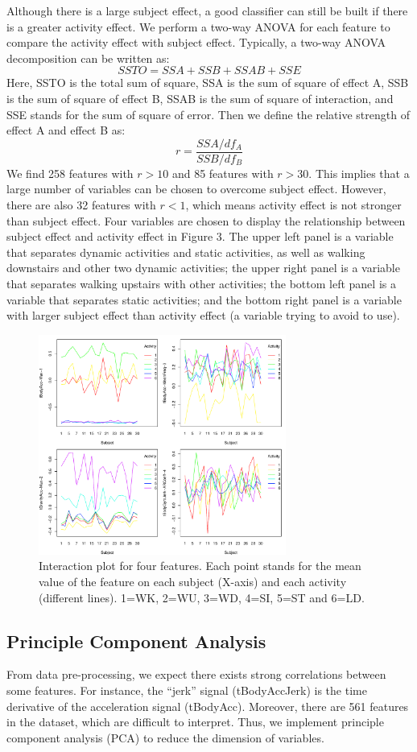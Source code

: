 \documentclass[conference]{IEEEtran}
\begin{document}
Although there is a large subject effect, a good classifier can still be built if there is a greater activity effect. We perform a two-way ANOVA for each feature to compare the activity effect with subject effect. Typically, a two-way ANOVA decomposition can be written as:
$$SSTO=SSA+SSB+SSAB+SSE$$
Here, SSTO is the total sum of square, SSA is the sum of square of effect A, SSB is the sum of square of effect B, SSAB is the sum of square of interaction, and SSE stands for the sum of square of error. Then we define the relative strength of effect A and effect B as:
$$r=\frac{SSA/df_{A}}{SSB/df_{B}}$$
We find 258 features with $r>10$ and 85 features with $r>30$. This implies that a large number of variables can be chosen to overcome subject effect. However, there are also 32 features with $r<1$, which means activity effect is not stronger than subject effect. Four variables are chosen to display the relationship between subject effect and activity effect in Figure 3. The upper left panel is a variable that separates dynamic activities and static activities, as well as walking downstairs and other two dynamic activities; the upper right panel is a variable that separates walking upstairs with other activities; the bottom left panel is a variable that separates static activities; and the bottom right panel is a variable with larger subject effect than activity effect (a variable trying to avoid to use).

\begin{figure}[!ht]
\centering
\includegraphics[width=3.2in]{figure3.pdf}
\caption{Interaction plot for four features. Each point stands for the mean value of the feature on each subject (X-axis) and each activity (different lines). 1=WK, 2=WU, 3=WD, 4=SI, 5=ST and 6=LD.
}
\label{fig_sim}
\end{figure}

\subsection{Principle Component Analysis}
From data pre-processing, we expect there exists strong correlations between some features. For instance, the “jerk” signal (tBodyAccJerk) is the time derivative of the acceleration signal (tBodyAcc). Moreover, there are 561 features in the dataset, which are difficult to interpret. Thus, we implement principle component analysis (PCA) to reduce the dimension of variables.
\end{document}
